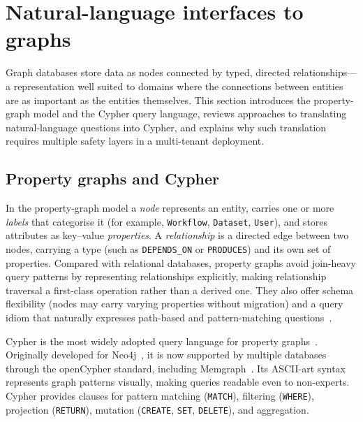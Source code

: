 \documentclass[a4paper,noexaminfo]{sapthesis}
\begin{document}
\section{Natural-language interfaces to graphs}
\label{sec:nl-graphs}

Graph databases store data as nodes connected by typed, directed
relationships---a representation well suited to domains where the
connections between entities are as important as the entities themselves.
This section introduces the property-graph model and the Cypher query
language, reviews approaches to translating natural-language questions into
Cypher, and explains why such translation requires multiple safety layers
in a multi-tenant deployment.

\subsection{Property graphs and Cypher}

In the property-graph model a \emph{node} represents an entity, carries one
or more \emph{labels} that categorise it (for example,
\texttt{Workflow}, \texttt{Dataset}, \texttt{User}), and stores attributes as
key--value \emph{properties}.  A \emph{relationship} is a directed edge
between two nodes, carrying a type (such as \texttt{DEPENDS\_ON} or
\texttt{PRODUCES}) and its own set of properties.  Compared with
relational databases, property graphs avoid join-heavy query patterns by
representing relationships explicitly, making relationship traversal a
first-class operation rather than a derived one.  They also offer schema
flexibility (nodes may carry varying properties without migration) and a
query idiom that naturally expresses path-based and pattern-matching
questions~\cite{francis2018cypher,hogan2021knowledge}.

Cypher is the most widely adopted query language for property
graphs~\cite{opencypher2023}.  Originally developed for
Neo4j~\cite{neo4j2023}, it is now supported by multiple databases through
the openCypher standard, including Memgraph~\cite{memgraph2023}.
Its ASCII-art syntax represents graph patterns visually, making queries
readable even to non-experts.  Cypher provides clauses for pattern matching
(\texttt{MATCH}), filtering (\texttt{WHERE}), projection (\texttt{RETURN}),
mutation (\texttt{CREATE}, \texttt{SET}, \texttt{DELETE}), and aggregation.
\end{document}
